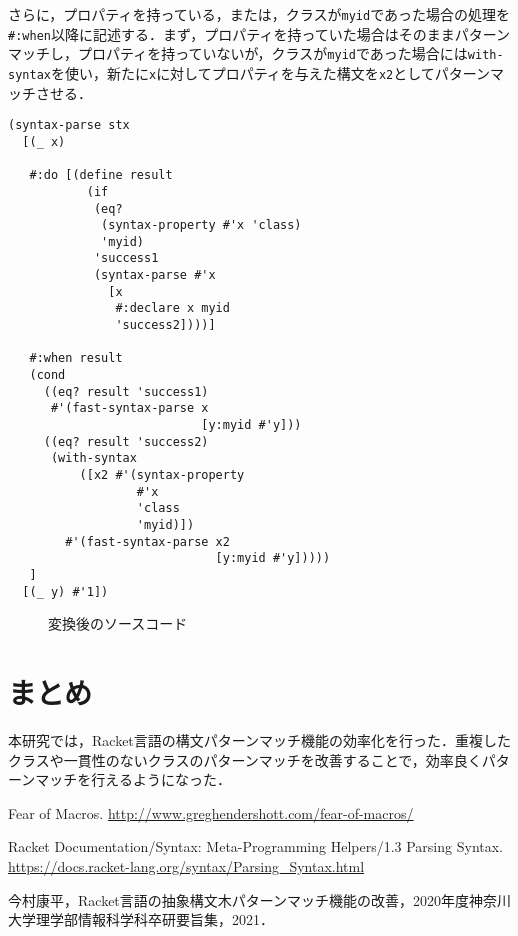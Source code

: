 \documentclass[twocolumn]{jsarticle}
\begin{document}
さらに，プロパティを持っている，または，クラスが\verb|myid|であった場合の処理を\verb|#:when|以降に記述する．まず，プロパティを持っていた場合はそのままパターンマッチし，プロパティを持っていないが，クラスが\verb|myid|であった場合には\verb|with-syntax|を使い，新たに\verb|x|に対してプロパティを与えた構文を\verb|x2|としてパターンマッチさせる．

\setlength{\baselineskip}{11pt}
\begin{verbatim}
(syntax-parse stx
  [(_ x)
   
   #:do [(define result
           (if
            (eq?
             (syntax-property #'x 'class)
             'myid)
            'success1
            (syntax-parse #'x
              [x
               #:declare x myid
               'success2])))]
   
   #:when result
   (cond 
     ((eq? result 'success1)
      #'(fast-syntax-parse x
                           [y:myid #'y]))
     ((eq? result 'success2)
      (with-syntax
          ([x2 #'(syntax-property
                  #'x
                  'class
                  'myid)])
        #'(fast-syntax-parse x2
                             [y:myid #'y]))))
   ]
  [(_ y) #'1])
\end{verbatim}
\begin{figure}[h]
\vspace*{-0.5cm}
\caption{変換後のソースコード}
\label{fig:my_label2}
\end{figure}
\vspace*{-0.5cm}
\setlength{\baselineskip}{14pt}
\section{まとめ}
本研究では，Racket言語の構文パターンマッチ機能の効率化を行った．重複したクラスや一貫性のないクラスのパターンマッチを改善することで，効率良くパターンマッチを行えるようになった．

\begin{thebibliography}{99}

Fear of Macros.\newline
\url{http://www.greghendershott.com/fear-of-macros/}

Racket Documentation/Syntax: Meta-Programming Helpers/1.3 Parsing Syntax.\newline
\url{https://docs.racket-lang.org/syntax/Parsing_Syntax.html}

今村康平，Racket言語の抽象構文木パターンマッチ機能の改善，2020年度神奈川大学理学部情報科学科卒研要旨集，2021．
\end{thebibliography}
\end{document}
